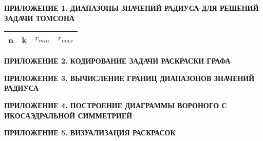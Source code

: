 


\lstset{style=mystyle}


\newpage
\begin{center}
\noindent\textbf{ПРИЛОЖЕНИЕ 1. ДИАПАЗОНЫ ЗНАЧЕНИЙ РАДИУСА ДЛЯ РЕШЕНИЙ ЗАДАЧИ ТОМСОНА}\label{attachments:1}
\vspace{1.5mm}
\end{center}

\begin{longtable}{ccll} 
\hline
n & k & $r_{min}$ & $r_{max}$ \\ 
\hline
\endhead

\hline
\end{longtable}

\newpage
\begin{center}
\noindent\textbf{ПРИЛОЖЕНИЕ 2. КОДИРОВАНИЕ ЗАДАЧИ РАСКРАСКИ ГРАФА}\label{attachments:2}
\vspace{1.5mm}
\end{center}



\newpage
\begin{center}
\noindent\textbf{ПРИЛОЖЕНИЕ 3. ВЫЧИСЛЕНИЕ ГРАНИЦ ДИАПАЗОНОВ ЗНАЧЕНИЙ РАДИУСА}\label{attachments:3}
\vspace{1.5mm}
\end{center}



\newpage
\begin{center}
\noindent\textbf{ПРИЛОЖЕНИЕ 4. ПОСТРОЕНИЕ ДИАГРАММЫ ВОРОНОГО С ИКОСАЭДРАЛЬНОЙ СИММЕТРИЕЙ}\label{attachments:4}
\vspace{1.5mm}
\end{center}



\newpage
\begin{center}
\noindent\textbf{ПРИЛОЖЕНИЕ 5. ВИЗУАЛИЗАЦИЯ РАСКРАСОК}\label{attachments:5}
\vspace{1.5mm}
\end{center}


